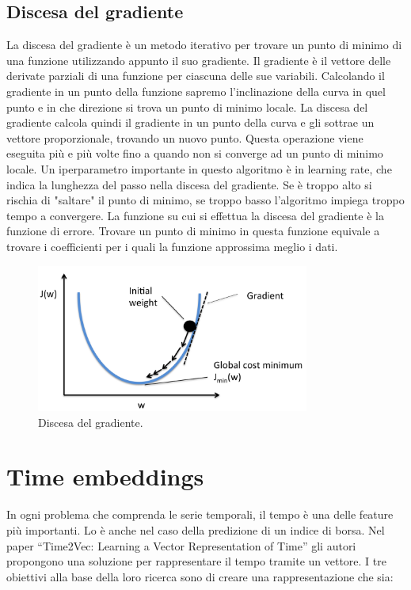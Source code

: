 \documentclass[12pt,a4paper,twoside,openright]{book}
\begin{document}
\subsection{Discesa del gradiente}
La discesa del gradiente\cite{DBLP:conf/icnn/Lewis88} è un metodo iterativo per trovare un punto di minimo di una funzione utilizzando appunto il suo gradiente.
Il gradiente è il vettore delle derivate parziali di una funzione per ciascuna delle sue variabili. Calcolando il gradiente in un punto della funzione sapremo l'inclinazione della curva in quel punto e in che direzione si trova un punto di minimo locale.
La discesa del gradiente calcola quindi il gradiente in un punto della curva e gli sottrae un vettore proporzionale, trovando un nuovo punto. Questa operazione viene eseguita più e più volte fino a quando non si converge ad un punto di minimo locale.
Un iperparametro importante in questo algoritmo è in learning rate, che indica la lunghezza del passo nella discesa del gradiente. Se è troppo alto si rischia di "saltare" il punto di minimo, se troppo basso l'algoritmo impiega troppo tempo a convergere.
La funzione su cui si effettua la discesa del gradiente è la funzione di errore. Trovare un punto di minimo in questa funzione equivale a trovare i coefficienti per i quali la funzione approssima meglio i dati.

\begin{figure}[H]
\centering
\includegraphics[width=0.8\textwidth]{images/gradient.png}
\caption{Discesa del gradiente.}
\label{fig:rapp_file}
\end{figure}

\section{Time embeddings}

In ogni problema che comprenda le serie temporali, il tempo è una delle feature più importanti. Lo è anche nel caso della predizione di un indice di borsa.
Nel paper “Time2Vec: Learning a Vector Representation of Time”\cite{DBLP:journals/corr/abs-1907-05321} gli autori propongono una soluzione per rappresentare il tempo tramite un vettore. I tre obiettivi alla base della loro ricerca sono di creare una rappresentazione che sia:
\end{document}
